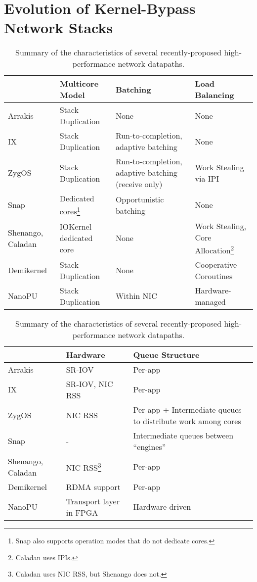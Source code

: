 \section{Evolution of Kernel-Bypass Network Stacks}
\begin{table}
    \small
    \begin{minipage}{\textwidth}
    \begin{tabular}{p{2cm} p{3cm} p{3.5cm} p{3cm}}
        \hline
                         & \textbf{Multicore Model} & \textbf{Batching} & \textbf{Load Balancing} \\
        \hline
        Arrakis          & Stack Duplication & None & None \\
        IX               & Stack Duplication & Run-to-completion, adaptive batching & None \\
        ZygOS            & Stack Duplication & Run-to-completion, adaptive batching (receive only) & Work Stealing via IPI \\
        Snap             & Dedicated cores\footnote{Snap also supports operation modes that do not dedicate cores.} & Opportunistic batching & None \\
        Shenango, Caladan& IOKernel dedicated core & None & Work Stealing, Core Allocation\footnote{Caladan uses IPIs.} \\
        Demikernel       & Stack Duplication & None & Cooperative Coroutines \\
        NanoPU           & Stack Duplication & Within NIC & Hardware-managed \\
        \hline
    \end{tabular}
    \begin{tabular}{p{2cm} p{3cm} p{6.5cm}}
        \hline
                         & \textbf{Hardware} & \textbf{Queue Structure} \\
        \hline
        Arrakis          & SR-IOV & Per-app \\
        IX               & SR-IOV, NIC RSS & Per-app \\
        ZygOS            & NIC RSS & Per-app + Intermediate queues to distribute work among cores \\
        Snap             & - & Intermediate queues between ``engines'' \\
        Shenango, Caladan& NIC RSS\footnote{Caladan uses NIC RSS, but Shenango does not.} & Per-app \\
        Demikernel       & RDMA support & Per-app \\
        NanoPU           & Transport layer in FPGA & Hardware-driven \\
        \hline
    \end{tabular}
    \end{minipage}
    \caption{Summary of the characteristics of several recently-proposed high-performance network datapaths. }
    \label{t:systems}
\end{table}
